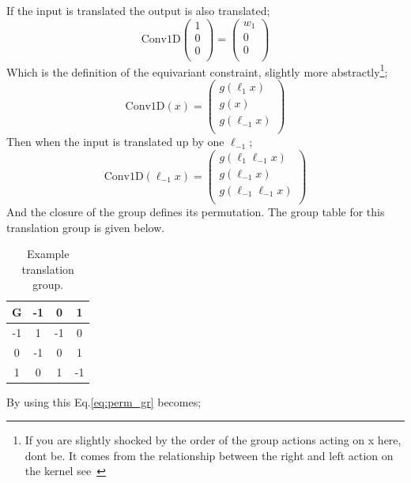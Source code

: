 If the input is translated the output is also translated;
\begin{equation}
	\text{Conv1D}\begin{pmatrix}
		1 \\
		0 \\
		0 \\
	\end{pmatrix}
	= \begin{pmatrix}
		w_1 \\
		0   \\
		0   \\
	\end{pmatrix}
\end{equation}
Which is the definition of the equivariant constraint, slightly more abstractly\footnote{If you are slightly shocked by the order of the group actions acting on x here, dont be. It comes from the relationship between the right and left action on the kernel see~\cite{cohen2016group}};
\begin{equation}
	\text{Conv1D}(x) = \begin{pmatrix}
		g(\ell_{1}x)   \\
		g(x)           \\
		g(\ell_{-1} x) \\
	\end{pmatrix}
\end{equation}
Then when the input is translated up by one $\ell_{-1}$;
\begin{equation}\label{eq:perm_gr}
	\text{Conv1D}(\ell_{-1} x) = \begin{pmatrix}
		g(\ell_{1}\ell_{-1}x)   \\
		g(\ell_{-1}x)           \\
		g(\ell_{-1}\ell_{-1} x) \\
	\end{pmatrix}
\end{equation}
And the closure of the group defines its permutation. The group table for this translation group is given below.
\begin{table}[h]
	\centering
	\begin{tabular}{|c| c c c|}
		\hline
		G  & -1 & 0  & 1  \\
		\hline
		-1 & 1  & -1 & 0  \\
		0  & -1 & 0  & 1  \\
		1  & 0  & 1  & -1 \\
		\hline
	\end{tabular}
	\caption{Example translation group.}
\end{table}
By using this Eq.\ref{eq:perm_gr} becomes;

